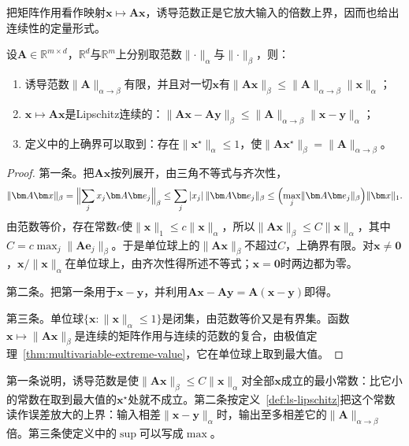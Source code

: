 把矩阵作用看作映射$\bm x\mapsto\bm A\bm x$，诱导范数正是它放大输入的倍数上界，因而也给出连续性的定量形式。
\begin{theorem}[线性作用的连续性]
\label{thm:ls-linear-map-continuity}
设$\bm A\in\mathbb R^{m\times d}$，$\mathbb R^d$与$\mathbb R^m$上分别取范数$\lVert\cdot\rVert_\alpha$与$\lVert\cdot\rVert_\beta$，则：
\begin{enumerate}
 \item 诱导范数$\lVert\bm A\rVert_{\alpha\to\beta}$有限，并且对一切$\bm x$有$\lVert\bm A\bm x\rVert_\beta\leq\lVert\bm A\rVert_{\alpha\to\beta}\lVert\bm x\rVert_\alpha$；
 \item $\bm x\mapsto\bm A\bm x$是Lipschitz连续的：$\lVert\bm A\bm x-\bm A\bm y\rVert_\beta\leq\lVert\bm A\rVert_{\alpha\to\beta}\lVert\bm x-\bm y\rVert_\alpha$；
 \item 定义中的上确界可以取到：存在$\lVert\bm x^\star\rVert_\alpha\leq1$，使$\lVert\bm A\bm x^\star\rVert_\beta=\lVert\bm A\rVert_{\alpha\to\beta}$。
\end{enumerate}
\end{theorem}
\begin{proof}
第一条。把$\bm A\bm x$按列展开，由三角不等式与齐次性，
\[
 \lVert\bm A\bm x\rVert_\beta=\Bigl\lVert\sum_jx_j\bm A\bm e_j\Bigr\rVert_\beta\leq\sum_j|x_j|\,\lVert\bm A\bm e_j\rVert_\beta\leq\Bigl(\max_j\lVert\bm A\bm e_j\rVert_\beta\Bigr)\lVert\bm x\rVert_1 .
\]
由范数等价，存在常数$c$使$\lVert\bm x\rVert_1\leq c\lVert\bm x\rVert_\alpha$，所以$\lVert\bm A\bm x\rVert_\beta\leq C\lVert\bm x\rVert_\alpha$，其中$C=c\max_j\lVert\bm A\bm e_j\rVert_\beta$。于是单位球上的$\lVert\bm A\bm x\rVert_\beta$不超过$C$，上确界有限。对$\bm x\neq\bm0$，$\bm x/\lVert\bm x\rVert_\alpha$在单位球上，由齐次性得所述不等式；$\bm x=\bm0$时两边都为零。

第二条。把第一条用于$\bm x-\bm y$，并利用$\bm A\bm x-\bm A\bm y=\bm A(\bm x-\bm y)$即得。

第三条。单位球$\{\bm x:\lVert\bm x\rVert_\alpha\leq1\}$是闭集，由范数等价又是有界集。函数$\bm x\mapsto\lVert\bm A\bm x\rVert_\beta$是连续的矩阵作用与连续的范数的复合，由极值定理~\ref{thm:multivariable-extreme-value}，它在单位球上取到最大值。
\end{proof}
第一条说明，诱导范数是使$\lVert\bm A\bm x\rVert_\beta\leq C\lVert\bm x\rVert_\alpha$对全部$\bm x$成立的最小常数：比它小的常数在取到最大值的$\bm x^\star$处就不成立。第二条按定义~\ref{def:ls-lipschitz}把这个常数读作误差放大的上界：输入相差$\lVert\bm x-\bm y\rVert_\alpha$时，输出至多相差它的$\lVert\bm A\rVert_{\alpha\to\beta}$倍。第三条使定义中的$\sup$可以写成$\max$。

